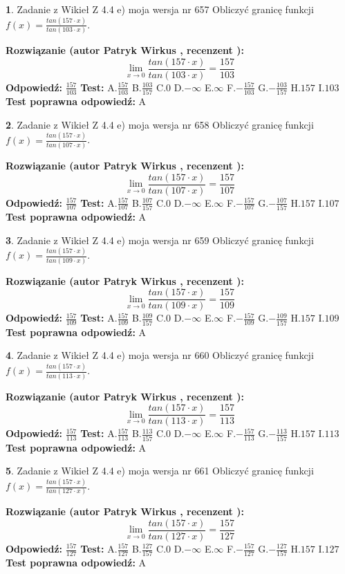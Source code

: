 \documentclass[12pt, a4paper]{article}
\theoremstyle{definition} %
\newtheorem{zad}{}
\newcommand{\zadStart}[1]{\begin{zad}#1\newline}
\newcommand{\zadStop}{\end{zad}}
\newcommand{\rozwStart}[2]{\noindent \textbf{Rozwiązanie (autor #1 , recenzent #2): }\newline}
\newcommand{\rozwStop}{\newline}
\newcommand{\odpStart}{\noindent \textbf{Odpowiedź:}\newline}
\newcommand{\odpStop}{\newline}
\newcommand{\testStart}{\noindent \textbf{Test:}\newline}
\newcommand{\testStop}{\newline}
\newcommand{\kluczStart}{\noindent \textbf{Test poprawna odpowiedź:}\newline}
\newcommand{\kluczStop}{\newline}
\begin{document}
\zadStart{Zadanie z Wikieł Z 4.4 e) moja wersja nr 657}
Obliczyć granicę funkcji $f(x)=\frac{tan(157\cdot x)}{tan(103\cdot x)}$.
\zadStop
\rozwStart{Patryk Wirkus}{}
$$\lim\limits_{x\to 0}\frac{tan(157\cdot x)}{tan(103\cdot x)}=
\frac{157}{103}$$
\rozwStop
\odpStart
$\frac{157}{103}$
\odpStop
\testStart
A.$\frac{157}{103}$
B.$\frac{103}{157}$
C.$0$
D.$-\infty$
E.$\infty$
F.$-\frac{157}{103}$
G.$-\frac{103}{157}$
H.$157$
I.$103$
\testStop
\kluczStart
A
\kluczStop



\zadStart{Zadanie z Wikieł Z 4.4 e) moja wersja nr 658}
Obliczyć granicę funkcji $f(x)=\frac{tan(157\cdot x)}{tan(107\cdot x)}$.
\zadStop
\rozwStart{Patryk Wirkus}{}
$$\lim\limits_{x\to 0}\frac{tan(157\cdot x)}{tan(107\cdot x)}=
\frac{157}{107}$$
\rozwStop
\odpStart
$\frac{157}{107}$
\odpStop
\testStart
A.$\frac{157}{107}$
B.$\frac{107}{157}$
C.$0$
D.$-\infty$
E.$\infty$
F.$-\frac{157}{107}$
G.$-\frac{107}{157}$
H.$157$
I.$107$
\testStop
\kluczStart
A
\kluczStop



\zadStart{Zadanie z Wikieł Z 4.4 e) moja wersja nr 659}
Obliczyć granicę funkcji $f(x)=\frac{tan(157\cdot x)}{tan(109\cdot x)}$.
\zadStop
\rozwStart{Patryk Wirkus}{}
$$\lim\limits_{x\to 0}\frac{tan(157\cdot x)}{tan(109\cdot x)}=
\frac{157}{109}$$
\rozwStop
\odpStart
$\frac{157}{109}$
\odpStop
\testStart
A.$\frac{157}{109}$
B.$\frac{109}{157}$
C.$0$
D.$-\infty$
E.$\infty$
F.$-\frac{157}{109}$
G.$-\frac{109}{157}$
H.$157$
I.$109$
\testStop
\kluczStart
A
\kluczStop



\zadStart{Zadanie z Wikieł Z 4.4 e) moja wersja nr 660}
Obliczyć granicę funkcji $f(x)=\frac{tan(157\cdot x)}{tan(113\cdot x)}$.
\zadStop
\rozwStart{Patryk Wirkus}{}
$$\lim\limits_{x\to 0}\frac{tan(157\cdot x)}{tan(113\cdot x)}=
\frac{157}{113}$$
\rozwStop
\odpStart
$\frac{157}{113}$
\odpStop
\testStart
A.$\frac{157}{113}$
B.$\frac{113}{157}$
C.$0$
D.$-\infty$
E.$\infty$
F.$-\frac{157}{113}$
G.$-\frac{113}{157}$
H.$157$
I.$113$
\testStop
\kluczStart
A
\kluczStop



\zadStart{Zadanie z Wikieł Z 4.4 e) moja wersja nr 661}
Obliczyć granicę funkcji $f(x)=\frac{tan(157\cdot x)}{tan(127\cdot x)}$.
\zadStop
\rozwStart{Patryk Wirkus}{}
$$\lim\limits_{x\to 0}\frac{tan(157\cdot x)}{tan(127\cdot x)}=
\frac{157}{127}$$
\rozwStop
\odpStart
$\frac{157}{127}$
\odpStop
\testStart
A.$\frac{157}{127}$
B.$\frac{127}{157}$
C.$0$
D.$-\infty$
E.$\infty$
F.$-\frac{157}{127}$
G.$-\frac{127}{157}$
H.$157$
I.$127$
\testStop
\kluczStart
A
\kluczStop
\end{document}
